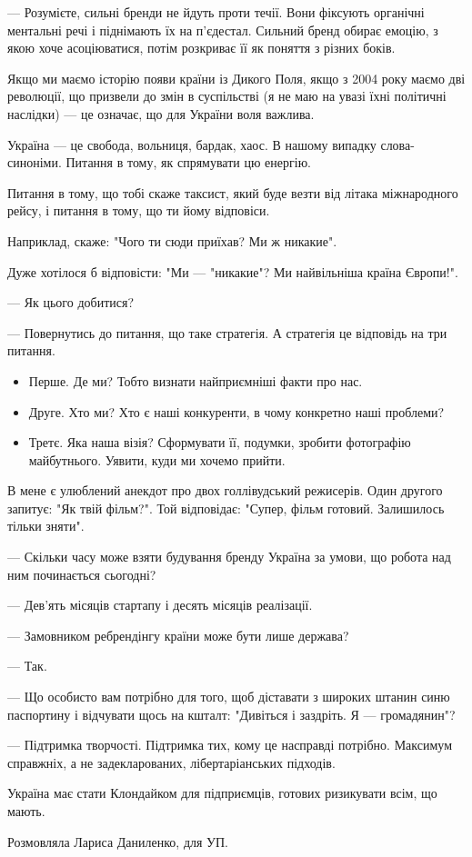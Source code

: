 --- Розумієте, сильні бренди не йдуть проти течії. Вони фіксують органічні
ментальні речі і піднімають їх на п’єдестал. Сильний бренд обирає емоцію, з
якою хоче асоціюватися, потім розкриває її як поняття з різних боків.

Якщо ми маємо історію появи країни із Дикого Поля, якщо з 2004 року маємо дві
революції, що призвели до змін в суспільстві (я не маю на увазі їхні політичні
наслідки) --- це означає, що для України воля важлива. 

Україна --- це свобода, вольниця, бардак, хаос. В нашому випадку слова-синоніми.
Питання в тому, як спрямувати цю енергію. 

Питання в тому, що тобі скаже таксист, який буде везти від літака міжнародного
рейсу, і питання в тому, що ти йому відповіси.

Наприклад, скаже: "Чого ти сюди приїхав? Ми ж никакие".

Дуже хотілося б відповісти: "Ми --- "никакие"? Ми найвільніша країна Європи!".

--- Як цього добитися?

--- Повернутись до питання, що таке стратегія. А стратегія це відповідь на три
питання.

\begin{itemize}
	\item Перше. Де ми? Тобто визнати найприємніші факти про нас.
	\item Друге. Хто ми? Хто є наші конкуренти, в чому конкретно наші проблеми?
	\item Третє. Яка наша візія? Сформувати її, подумки, зробити фотографію майбутнього. Уявити, куди ми хочемо прийти.
\end{itemize}

В мене є улюблений анекдот про двох голлівудський режисерів. Один другого
запитує: "Як твій фільм?". Той відповідає: "Супер, фільм готовий. Залишилось
тільки зняти".

--- Скільки часу може взяти будування бренду Україна за умови, що робота над ним
починається сьогодні?

--- Дев’ять місяців стартапу і десять місяців реалізації.

--- Замовником ребрендінгу країни може бути лише держава?

--- Так.

--- Що особисто вам потрібно для того, щоб діставати з широких штанин синю
паспортину і відчувати щось на кшталт: "Дивіться і заздріть. Я --- громадянин"?

--- Підтримка творчості. Підтримка тих, кому це насправді потрібно. Максимум
справжніх, а не задекларованих, лібертаріанських підходів. 

Україна має стати Клондайком для підприємців, готових ризикувати всім, що
мають. 

Розмовляла Лариса Даниленко, для УП.
